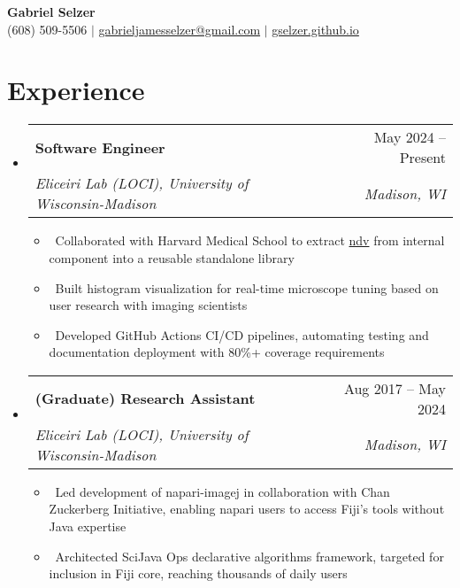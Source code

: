 \documentclass[letterpaper,10pt]{article}
\makeatletter
\newcommand{\resumeItem}[1]{\item\small{#1}}
\newcommand{\resumeSubheading}[4]{
\vspace{-1pt}\item
  \begin{tabular*}{0.97\textwidth}[t]{l@{\extracolsep{\fill}}r}
    \textbf{#1} & #2 \\
    \textit{#3} & \textit{#4} \\
  \end{tabular*}\vspace{-7pt}
}
\newcommand{\resumeSubHeadingList}{\begin{itemize}[leftmargin=0.15in, label={}]}
\newcommand{\resumeSubHeadingListEnd}{\end{itemize}}
\makeatother
\begin{document}
\begin{center}
  \textbf{\Huge Gabriel Selzer} \\
  \small (608) 509-5506 $|$ \href{mailto:gabrieljamesselzer@gmail.com}{gabrieljamesselzer@gmail.com} $|$ 
  \href{https://gselzer.github.io}{gselzer.github.io}
\end{center}



\section{Experience}
\resumeSubHeadingList
  \resumeSubheading
      {Software Engineer}{May 2024 -- Present}
      {Eliceiri Lab (LOCI), University of Wisconsin-Madison}{Madison, WI}
      \resumeSubHeadingList
          \resumeItem{\textbullet\ Collaborated with Harvard Medical School to extract \href{https://pyapp-kit.github.io/ndv/latest/}{ndv} from internal component into a reusable standalone library}
          \resumeItem{\textbullet\ Built histogram visualization for real-time microscope tuning based on user research with imaging scientists}
          \resumeItem{\textbullet\ Developed GitHub Actions CI/CD pipelines, automating testing and documentation deployment with 80\%+ coverage requirements}
      \resumeSubHeadingListEnd
  \resumeSubheading
      {(Graduate) Research Assistant}{Aug 2017 -- May 2024}
      {Eliceiri Lab (LOCI), University of Wisconsin-Madison}{Madison, WI}
      \resumeSubHeadingList
          \resumeItem{\textbullet\ Led development of napari-imagej in collaboration with Chan Zuckerberg Initiative, enabling napari users to access Fiji's tools without Java expertise}
          \resumeItem{\textbullet\ Architected SciJava Ops declarative algorithms framework, targeted for inclusion in Fiji core, reaching thousands of daily users}
      \resumeSubHeadingListEnd
\resumeSubHeadingListEnd
\end{document}
